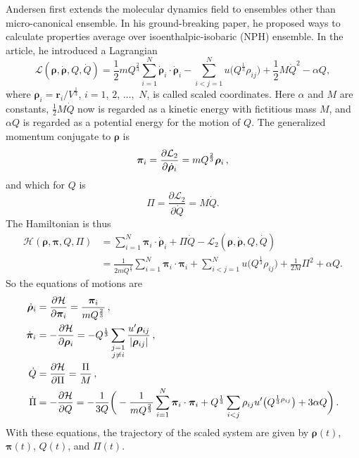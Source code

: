 Andersen first extends the molecular dynamics field to
ensembles other than micro-canonical ensemble.\cite{Andersen:1980ew}
In his ground-breaking paper, he proposed ways to calculate properties average
over isoenthalpic-isobaric (NPH) ensemble. In the article, he introduced
a Lagrangian
\begin{equation}\label{eq:andersenlagrang}
	\mathcal{L}(\bm{\rho}, \dot{\bm{\rho}}, Q, \dot{ Q }) = \frac{ 1 }{ 2 } m
	Q^{\frac{ 2 }{ 3 }}
	\sum_{i=1}^{N} \dot{ \bm{\rho} }_i \cdot \dot{ \bm{\rho} }_i - \sum_{i<j=1}^{N}
	u \big(Q^{\frac{ 1 }{ 3 }} \rho_{ij} \big) + \frac{ 1 }{ 2 } M \dot{ Q } ^2 -
	\alpha Q,
\end{equation}
where $\bm{\rho}_i = \bm{r}_i / V ^{\frac{ 1 }{ 3 }}$, $i=1$, $2$, $\ldots$,~$N$,
is called scaled coordinates. Here $\alpha$ and $M$ are constants,
$\frac{ 1 }{ 2 } M \dot{ Q }$ now is regarded as a kinetic energy with fictitious
mass $M$,
and $\alpha Q$ is regarded as a potential energy for the motion of $Q$.
The generalized momentum conjugate to $\bm{\rho}$ is
\begin{equation}
	\bm{\pi}_i = \frac{ \partial \mathcal{L}_2 }{ \partial \dot{ \bm{\rho} }_i } =
	m Q^{\frac{ 2 }{ 3 }} \bm{\rho}_i \thinspace,
\end{equation}
and which for $Q$ is
\begin{equation}
	\Pi = \frac{ \partial \mathcal{L}_2 }{ \partial \dot{Q} } = M \dot{ Q }.
\end{equation}
The Hamiltonian is thus
\begin{equation}
	\begin{split}
		\mathcal{H}(\bm{\rho}, \bm{\pi}, Q, \Pi) &= \sum_{i=1}^{N} \bm{\pi}_i \cdot
		\dot{ \bm{\rho} }_i + \Pi \dot{ Q } - \mathcal{L}_2
		(\bm{\rho}, \dot{\bm{\rho}}, Q, \dot{ Q })\\
		&= \frac{ 1 }{ 2 m Q^{\frac{ 2 }{ 3 }} }
		\sum_{i=1}^{N} \bm{\pi}_i \cdot \bm{\pi}_i
		+ \sum_{i<j=1}^{N} u\big(Q^{\frac{ 1 }{ 3 }} \rho_{ij}\big) + \frac{ 1 }{ 2 M }
		\Pi^2 + \alpha Q.
	\end{split}
\end{equation}
So the equations of motions are
\begin{align}
	\dot{ \bm{\rho} }_i & = \frac{ \partial \mathcal{H} }{ \partial \bm{\pi}_i } =
	\frac{ \bm{\pi}_i }{ m Q^{\frac{ 2 }{ 3 }} } \thinspace,\\
	\dot{ \bm{\pi} }_i  & = - \frac{ \partial \mathcal{H} }{ \partial \bm{\rho}_i } =
	- Q^{\frac{ 1 }{ 3 }} \sum_{\substack{j=1\\j\neq i}}
	\frac{ u' \bm{\rho}_{ij} }{ \lvert \bm{\rho}_{ij} \rvert  } \thinspace,\\
	\dot{ Q }           & = \frac{ \partial \mathcal{H} }{ \partial \Pi } =
	\frac{ \Pi }{ M } \thinspace,\\
	\dot{ \Pi }         & = - \frac{ \partial \mathcal{H} }{ \partial Q } =
	- \frac{ 1 }{ 3Q } \bigg(
	- \frac{ 1 }{ m Q^{\frac{ 2 }{ 3 }} }	\sum_{i=1}^{N} \bm{\pi}_i \cdot \bm{\pi}_i
	+ Q^{\frac{ 1 }{ 3 }} \sum_{i<j} \rho_{ij} u'\big(Q^{\frac{ 1 }{ 3 } \rho_{ij}}\big) +
	3 \alpha Q
	\bigg) \thinspace.
\end{align}
With these equations, the trajectory of the scaled system are given by
$\bm{\rho}(t)$, $\bm{\pi}(t)$, $Q(t)$, and $\Pi(t)$.

